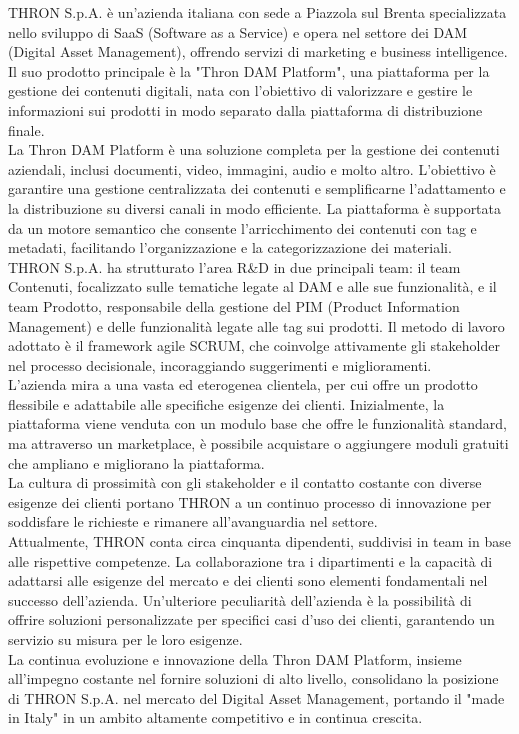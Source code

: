 THRON S.p.A. è un'azienda italiana  con sede a Piazzola sul Brenta specializzata nello sviluppo di SaaS (Software as a Service) e opera nel settore dei DAM (Digital Asset Management), offrendo servizi di marketing e business intelligence. \\
Il suo prodotto principale è la "Thron DAM Platform", una piattaforma per la gestione dei contenuti digitali, nata con l'obiettivo di valorizzare e gestire le informazioni sui prodotti in modo separato dalla piattaforma di distribuzione finale. \\
La Thron DAM Platform è una soluzione completa per la gestione dei contenuti aziendali, inclusi documenti, video, immagini, audio e molto altro. L'obiettivo è garantire una gestione centralizzata dei contenuti e semplificarne l'adattamento e 
la distribuzione su diversi canali in modo efficiente. La piattaforma è supportata da un motore semantico che consente l'arricchimento dei contenuti con tag e metadati, facilitando l'organizzazione e la categorizzazione dei materiali. \\
THRON S.p.A. ha strutturato l'area R\&D in due principali team: il team Contenuti, focalizzato sulle tematiche legate al DAM e alle sue funzionalità, e il team Prodotto, responsabile della gestione del PIM (Product Information Management) 
e delle funzionalità legate alle tag sui prodotti. Il metodo di lavoro adottato è il framework agile SCRUM, che coinvolge attivamente gli stakeholder nel processo decisionale, incoraggiando suggerimenti e miglioramenti. \\
L'azienda mira a una vasta ed eterogenea clientela, per cui offre un prodotto flessibile e adattabile alle specifiche esigenze dei clienti. Inizialmente, la piattaforma viene venduta con un modulo base che offre le funzionalità standard, ma attraverso un marketplace, è 
possibile acquistare o aggiungere moduli gratuiti che ampliano e migliorano la piattaforma. \\
La cultura di prossimità con gli stakeholder e il contatto costante con diverse esigenze dei clienti portano THRON a un continuo processo di innovazione per soddisfare le richieste e rimanere all'avanguardia nel settore. \\
Attualmente, THRON conta circa cinquanta dipendenti, suddivisi in team in base alle rispettive competenze. La collaborazione tra i dipartimenti e la capacità di adattarsi alle esigenze del mercato e dei clienti sono elementi fondamentali
 nel successo dell'azienda. Un'ulteriore peculiarità dell'azienda è la possibilità di offrire soluzioni personalizzate per specifici casi d'uso dei clienti, garantendo un servizio su misura per le loro esigenze. \\
La continua evoluzione e innovazione della Thron DAM Platform, insieme all'impegno costante nel fornire soluzioni di alto livello, consolidano la posizione di THRON S.p.A. nel mercato del Digital Asset Management, 
portando il "made in Italy" in un ambito altamente competitivo e in continua crescita. \\

